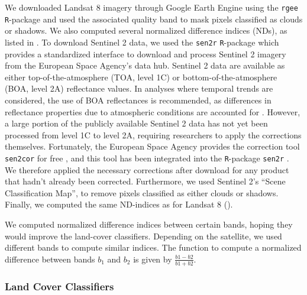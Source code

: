 \documentclass[abstract=on,10pt,a4paper,bibliography=totocnumbered]{article}
\begin{document}
We downloaded Landsat 8 imagery through Google Earth Engine using the
\texttt{rgee} \texttt{R}-package \citep{Aybar.2024} and used the associated
quality band to mask pixels classified as clouds or shadows. We also computed
several normalized difference indices (NDs), as listed in . To download
Sentinel 2 data, we used the \texttt{sen2r} \texttt{R}-package
\citep{Ranghetti.2020} which provides a standardized interface to download and
process Sentinel 2 imagery from the European Space Agency's data hub. Sentinel 2
data are available as either top-of-the-atmosphere (TOA, level 1C) or
bottom-of-the-atmosphere (BOA, level 2A) reflectance values. In analyses where
temporal trends are considered, the use of BOA reflectances is recommended, as
differences in reflectance properties due to atmospheric conditions are
accounted for \citep{Gilabert.1994, Vermote.2008, Chraibi.2022}. However, a
large portion of the publicly available Sentinel 2 data has not yet been
processed from level 1C to level 2A, requiring researchers to apply the
corrections themselves. Fortunately, the European Space Agency provides the
correction tool \texttt{sen2cor} for free \citep{Main-Knorn.2017}, and this tool
has been integrated into the \texttt{R}-package \texttt{sen2r}
\citep{Ranghetti.2020}. We therefore applied the necessary corrections after
download for any product that hadn't already been corrected. Furthermore, we
used Sentinel 2's ``Scene Classification Map'', to remove pixels classified as
either clouds or shadows. Finally, we computed the same ND-indices as for
Landsat 8 ().

\begin{table}[h]
  \begin{center}
  \caption{We computed normalized difference indices between certain bands,
  hoping they would improve the land-cover classifiers. Depending on the
  satellite, we used different bands to compute similar indices. The function to
  compute a normalized difference between bands $b_1$ and $b_2$ is given by
  $\frac{b1 - b2}{b1 + b2}$.}
  \label{ND}
  \begin{threeparttable}[h]
    
  \end{threeparttable}
  \end{center}
\end{table}

\subsubsection{Land Cover Classifiers}
\end{document}
